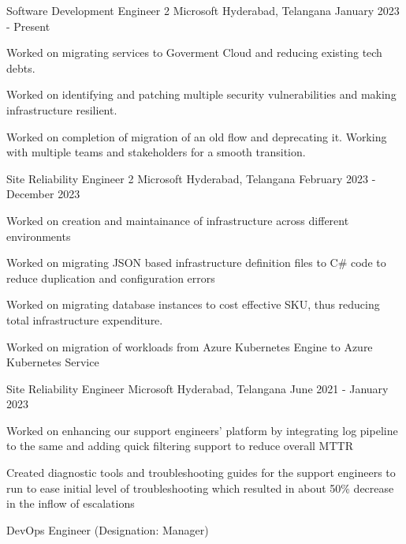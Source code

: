 
\begin{cventries}
  \cventry
  { Software Development Engineer 2}
  {Microsoft}
  {Hyderabad, Telangana}
  { January 2023 - Present}
  {
  \begin{cvitems}

      \item {Worked on migrating services to Goverment Cloud and reducing existing tech debts.}
      \item {Worked on identifying and patching multiple security vulnerabilities and making infrastructure resilient.}
      \item {Worked on completion of migration of an old flow and deprecating it. Working with multiple teams and stakeholders for a smooth transition.}
  \end{cvitems}
  }
  \cventry
  {Site Reliability Engineer 2} %
  {Microsoft} %
  {Hyderabad, Telangana} %
  {February 2023 - December 2023} %
  {
  \begin{cvitems} %
  \item {Worked on creation and maintainance of infrastructure across different environments}  
  \item {Worked on migrating JSON based infrastructure definition files to C\# code to reduce duplication and configuration errors}
  \item {Worked on migrating database instances to cost effective SKU, thus reducing total infrastructure expenditure.}
  \item {Worked on migration of workloads from Azure Kubernetes Engine to Azure Kubernetes Service}
  \end{cvitems}
  }
  \cventry
  {Site Reliability Engineer} %
  {Microsoft} %
  {Hyderabad, Telangana} %
  {June 2021 - January 2023} %
  {
  \begin{cvitems} %
  \item {Worked on enhancing our support engineers' platform by integrating log pipeline to the same and adding quick filtering support to reduce overall MTTR}
  \item {Created diagnostic tools and troubleshooting guides for the support engineers to run to ease initial level of troubleshooting which resulted in about 50\% decrease in the inflow of escalations}
  \end{cvitems}
  }
  \cventry
    {DevOps Engineer (Designation: Manager)} %

\end{cventries}
